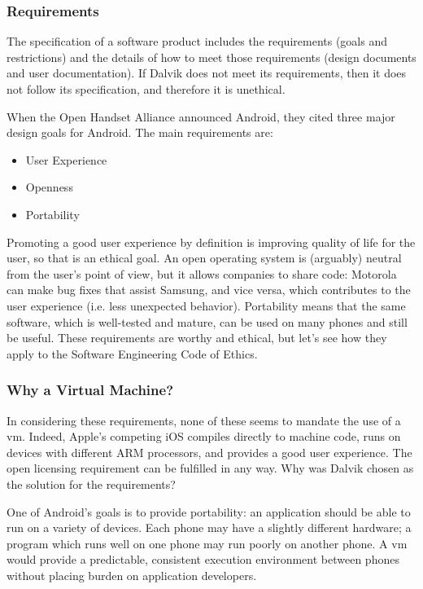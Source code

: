 \documentclass[11pt]{article}
\begin{document}
\begin{multicols}{2}
\subsubsection{Requirements} %
\label{ssub:requirements}

The specification of a software product includes the requirements (goals and
restrictions) and the details of how to meet those requirements (design
documents and user documentation).  If Dalvik does not meet its requirements,
then it does not follow its specification, and therefore it is unethical.

When the Open Handset Alliance announced Android, they cited three major
design goals for Android.  The main requirements are: \cite{open-handset-alliance-ann}

\begin{itemize}
    \item User Experience
    \item Openness
    \item Portability
\end{itemize}

Promoting a good user experience by definition is improving quality of life for
the user, so that is an ethical goal.  An open operating system is (arguably)
neutral from the user's point of view, but it allows companies to share code:
Motorola can make bug fixes that assist Samsung, and vice versa, which
contributes to the user experience (i.e. less unexpected behavior).  Portability
means that the same software, which is well-tested and mature, can be used on
many phones and still be useful.  These requirements are worthy and ethical, but let's
see how they apply to the Software Engineering Code of Ethics.


\subsubsection{Why a Virtual Machine?} %
\label{ssub:why-vm}

In considering these requirements, none of these seems to mandate the use of a
\gls{vm}.  Indeed, Apple's competing iOS compiles directly to machine code, runs
on devices with different ARM processors, and provides a good user experience.
The open licensing requirement can be fulfilled in any way.  Why was Dalvik
chosen as the solution for the requirements?

One of Android's goals is to provide portability: an application should be able
to run on a variety of devices.  Each phone may have a slightly different
hardware; a program which runs well on one phone may run poorly on another
phone.  A \gls{vm} would provide a predictable, consistent execution environment
between phones without placing burden on application developers.


\end{multicols}
\end{document}
